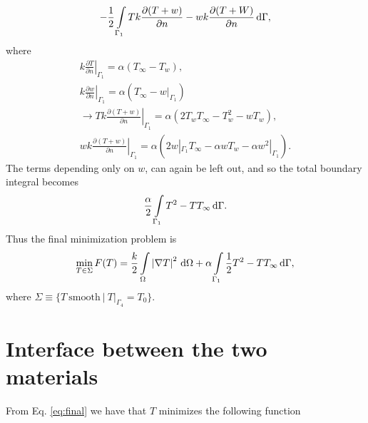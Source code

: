\begin{gather*}
    -\frac{1}{2}\int\displaylimits_{\Gamma_1} T k \frac{\partial(T+w)}{\partial n} - wk\frac{\partial(T+W)}{\partial n}\,\mathrm{d}\Gamma,
\end{gather*} where
\begin{gather*}
    k\left.\frac{\partial T}{\partial n}\right|_{\Gamma_1} = \alpha (T_{\infty} - T_w),\\
    k\left.\frac{\partial w}{\partial n}\right|_{\Gamma_1} = \alpha (T_{\infty} - w|_{\Gamma_1})\\
    \rightarrow Tk \left.\frac{\partial(T+w)}{\partial n}\right|_{\Gamma_1} = \alpha\left( 2T_w T_{\infty} - T_w^2 - wT_w \right), \\
    wk \left.\frac{\partial(T+w)}{\partial n}\right|_{\Gamma_1}
    = \alpha\left( 2w|_{\Gamma_1} T_{\infty} - \alpha w T_w - \alpha w^2|_{\Gamma_1} \right).
\end{gather*} The terms depending only on $w$, can again be left out, and so the total boundary integral becomes
\begin{gather*}
    \frac{\alpha}{2}\int\displaylimits_{\Gamma_1} T^2 - TT_{\infty} \,\mathrm{d}\Gamma. 
\end{gather*} Thus the final minimization problem is
\begin{gather}
    \min_{T\in\Sigma} F(T)=\frac{k}{2}\int\displaylimits_{\Omega} \left|\nabla T\right|^2 \,\mathrm{d}\Omega + \alpha \int\displaylimits_{\Gamma_1} \frac{1}{2}T^2 - TT_{\infty} \,\mathrm{d}\Gamma,
\label{eq:final}
\end{gather} where $\Sigma \equiv \{ T~\text{smooth}~|~T|_{\Gamma_4}=T_0 \}$.

\section{Interface between the two materials} 

From Eq. \ref{eq:final} we have that $T$ minimizes the following function


